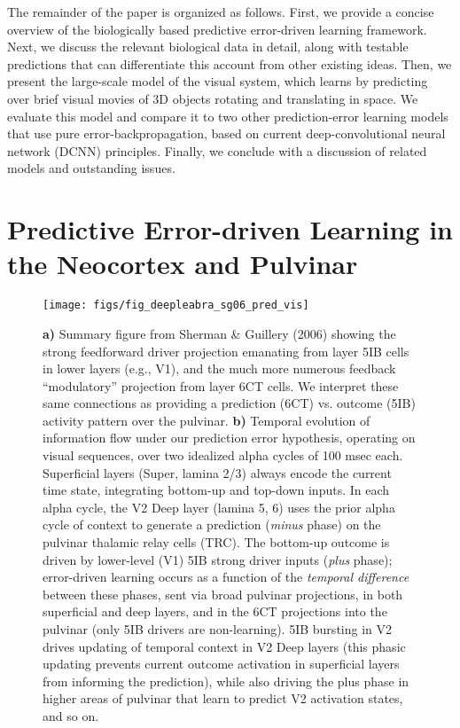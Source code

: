 \documentclass[11pt,twoside]{article}
\newif\myifpdf
\begin{document}
The remainder of the paper is organized as follows.  First, we provide a concise overview of the biologically based predictive error-driven learning framework.  Next, we discuss the relevant biological data in detail, along with testable predictions that can differentiate this account from other existing ideas.  Then, we present the large-scale model of the visual system, which learns by predicting over brief visual movies of 3D objects rotating and translating in space.  We evaluate this model and compare it to two other prediction-error learning models that use pure error-backpropagation, based on current deep-convolutional neural network (DCNN) principles. Finally, we conclude with a discussion of related models and outstanding issues.

\section{Predictive Error-driven Learning in the Neocortex and Pulvinar}

\begin{figure}
  \centering\texttt{[image: figs/fig\_deepleabra\_sg06\_pred\_vis]}
  \caption{{\bf a)} Summary figure from Sherman \& Guillery (2006) showing the strong feedforward driver projection emanating from layer 5IB cells in lower layers (e.g., V1), and the much more numerous feedback ``modulatory'' projection from layer 6CT cells.  We interpret these same connections as providing a prediction (6CT) vs. outcome (5IB) activity pattern over the pulvinar.  {\bf b)} Temporal evolution of information flow under our prediction error hypothesis, operating on visual sequences, over two idealized alpha cycles of 100 msec each.  Superficial layers (Super, lamina 2/3) always encode the current time state, integrating bottom-up and top-down inputs.  In each alpha cycle, the V2 Deep layer (lamina 5, 6) uses the prior alpha cycle of context to generate a prediction (\emph{minus} phase) on the pulvinar thalamic relay cells (TRC). The bottom-up outcome is driven by lower-level (V1) 5IB strong driver inputs (\emph{plus} phase); error-driven learning occurs as a function of the \emph{temporal difference} between these phases, sent via broad pulvinar projections, in both superficial and deep layers, and in the 6CT projections into the pulvinar (only 5IB drivers are non-learning).  5IB bursting in V2 drives updating of temporal context in V2 Deep layers (this phasic updating prevents current outcome activation in superficial layers from informing the prediction), while also driving the plus phase in higher areas of pulvinar that learn to predict V2 activation states, and so on.}
  \label{fig.sg06}
\end{figure}
\end{document}
